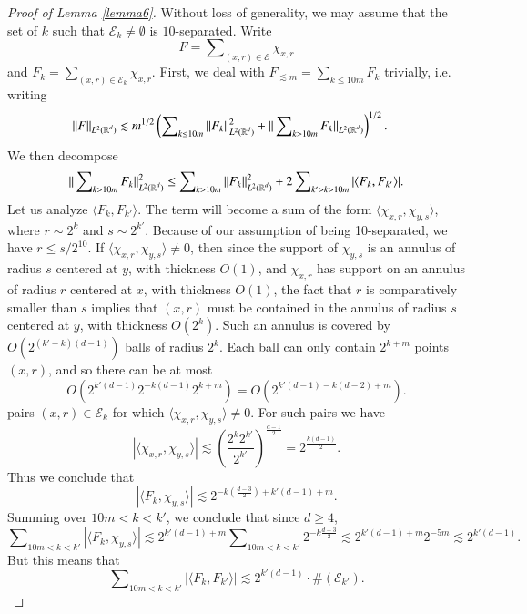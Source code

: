 \begin{proof}[Proof of Lemma \ref{lemma6}]
    Without loss of generality, we may assume that the set of $k$ such that $\mathcal{E}_k \neq \emptyset$ is $10$-separated. Write
    \[ F = \sum\nolimits_{(x,r) \in \mathcal{E}} \chi_{x,r} \]
    and $F_k = \sum\nolimits_{(x,r) \in \mathcal{E}_k} \chi_{x,r}$. First, we deal with $F_{\lesssim m} = \sum\nolimits_{k \leq 10 m} F_k$ trivially, i.e. writing
    \begin{align*}
        \| F \|_{L^2(\operatorname{\mathbb{R}}^d)} &\lesssim m^{1/2} \left( \sum\nolimits_{k \leq 10m} \| F_k \|_{L^2(\operatorname{\mathbb{R}}^d)}^2 + \| \sum\nolimits_{k > 10m} F_k \|_{L^2(\operatorname{\mathbb{R}}^d)} \right)^{1/2}.
    \end{align*}
    We then decompose
    \[ \| \sum\nolimits_{k > 10 m} F_k \|_{L^2(\operatorname{\mathbb{R}}^d)}^2 \leq \sum\nolimits_{k > 10 m} \| F_k \|_{L^2(\operatorname{\mathbb{R}}^d)}^2 + 2 \sum\nolimits_{k' > k > 10m} |\langle F_k, F_{k'} \rangle|. \]
    Let us analyze $\langle F_k, F_{k'} \rangle$. The term will become a sum of the form $\langle \chi_{x,r}, \chi_{y,s} \rangle$, where $r \sim 2^k$ and $s \sim 2^{k'}$. Because of our assumption of being 10-separated, we have $r \leq s / 2^{10}$. If $\langle \chi_{x,r}, \chi_{y,s} \rangle \neq 0$, then since the support of $\chi_{y,s}$ is an annulus of radius $s$ centered at $y$, with thickness $O(1)$, and $\chi_{x,r}$ has support on an annulus of radius $r$ centered at $x$, with thickness $O(1)$, the fact that $r$ is comparatively smaller than $s$ implies that $(x,r)$ must be contained in the annulus of radius $s$ centered at $y$, with thickness $O(2^k)$. Such an annulus is covered by $O( 2^{(k'-k)(d-1)} )$ balls of radius $2^k$. Each ball can only contain $2^{k + m}$ points $(x,r)$, and so there can be at most
    \[ O(2^{k'(d-1)} 2^{-k(d-1)} 2^{k+m} ) = O( 2^{k'(d-1) - k(d-2) + m} ). \]
    pairs $(x,r) \in \mathcal{E}_k$ for which $\langle \chi_{x,r}, \chi_{y,s} \rangle \neq 0$. For such pairs we have
    \[ |\langle \chi_{x,r}, \chi_{y,s} \rangle| \lesssim \left( \frac{2^k 2^{k'}}{2^{k'}} \right)^{\frac{d-1}{2}} = 2^{\frac{k(d-1)}{2}}. \]
    Thus we conclude that
    \[ |\langle F_k, \chi_{y,s} \rangle| \lesssim 2^{-k ( \frac{d-3}{2} ) + k'(d-1) + m }. \]
    Summing over $10m < k < k'$, we conclude that since $d \geq 4$,
    \[ \sum\nolimits_{10m < k < k'} |\langle F_k, \chi_{y,s} \rangle| \lesssim 2^{k'(d-1) + m} \sum\nolimits_{10m < k < k'} 2^{-k \frac{d-3}{2}} \lesssim 2^{k'(d-1) + m} 2^{-5m} \lesssim 2^{k'(d-1)}. \]
    But this means that
    \[ \sum\nolimits_{10m < k < k'} |\langle F_k, F_{k'} \rangle| \lesssim 2^{k'(d-1)} \cdot \# ( \mathcal{E}_{k'} ). \]

\end{proof}
